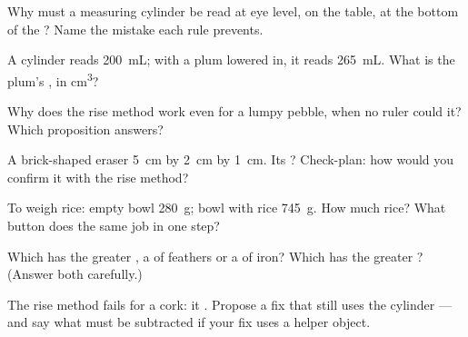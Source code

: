 \begin{exercise}[$\star$]\label{exo:g6:mass-and-volume:3}
Why must a measuring cylinder be read at eye level, on the table,
at the bottom of the ? Name the mistake each rule
prevents.
\end{exercise}

\begin{exercise}[$\star$]\label{exo:g6:mass-and-volume:4}
A cylinder reads \qty{200}{mL}; with a plum lowered in, it reads
\qty{265}{mL}. What is the plum's , in \unit{cm^3}?
\end{exercise}

\begin{exercise}[$\star$]\label{exo:g6:mass-and-volume:5}
Why does the rise method work even for a lumpy pebble, when no
ruler could  it? Which proposition answers?
\end{exercise}

\begin{exercise}[$\star$]\label{exo:g6:mass-and-volume:6}
A brick-shaped eraser  \qty{5}{cm} by \qty{2}{cm} by
\qty{1}{cm}. Its ? Check-plan: how would you confirm it
with the rise method?
\end{exercise}

\begin{exercise}[$\star$]\label{exo:g6:mass-and-volume:7}
To weigh rice: empty bowl \qty{280}{g}; bowl with rice
\qty{745}{g}. How much rice? What button does the same job in one
step?
\end{exercise}

\begin{exercise}[$\star$]\label{exo:g6:mass-and-volume:8}
Which has the greater , a  of feathers or a 
of iron? Which has the greater ? (Answer both carefully.)
\end{exercise}

\begin{exercise}[$\star\star$]\label{exo:g6:mass-and-volume:9}
The rise method fails for a cork: it . Propose a fix that
still uses the cylinder --- and say what must be subtracted if
your fix uses a helper object.
\end{exercise}

